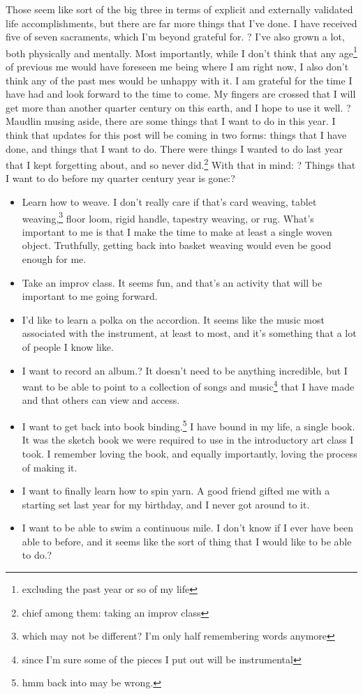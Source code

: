 \documentclass[12pt]{article}[titlepage]
\newcommand{\1}{\={a}}
\newcommand{\2}{\={e}}
\newcommand{\3}{\={\i}}
\newcommand{\4}{\=o}
\newcommand{\5}{\=u}
\newcommand{\6}{\={A}}
\renewcommand{\,}{\textsuperscript{,}}
\begin{document}
Those seem like sort of the big three in terms of explicit and externally validated life accomplishments, but there are far more things that I've done.
I have received five of seven sacraments, which I'm beyond grateful for.
?
I've also grown a lot, both physically and mentally.
Most importantly, while I don't think that any age\footnote{excluding the past year or so of my life} of previous me would have foreseen me being where I am right now, I also don't think any of the past mes would be unhappy with it.
I am grateful for the time I have had and look forward to the time to come.
My fingers are crossed that I will get more than another quarter century on this earth, and I hope to use it well.
?
Maudlin musing aside, there are some things that I want to do in this year.
I think that updates for this post will be coming in two forms: things that I have done, and things that I want to do.
There were things I wanted to do last year that I kept forgetting about, and so never did.\footnote{chief among them: taking an improv class}
With that in mind:
?
Things that I want to do before my quarter century year is gone:?
\begin{itemize}
\item Learn how to weave.
I don't really care if that's card weaving, tablet weaving,\footnote{which may not be different? I'm only half remembering words anymore} floor loom, rigid handle, tapestry weaving, or rug.
What's important to me is that I make the time to make at least a single woven object.
Truthfully, getting back into basket weaving would even be good enough for me.
\item Take an improv class.
It seems fun, and that's an activity that will be important to me going forward.
\item I'd like to learn a polka on the accordion.
It seems like the music most associated with the instrument, at least to most, and it's something that a lot of people I know like.
\item I want to record an album.?
It doesn't need to be anything incredible, but I want to be able to point to a collection of songs and music\footnote{since I'm sure some of the pieces I put out will be instrumental} that I have made and that others can view and access.
\item I want to get back into book binding.\footnote{hmm back into may be wrong.} I have bound in my life, a single book.
It was the sketch book we were required to use in the introductory art class I took.
I remember loving the book, and equally importantly, loving the process of making it.
\item I want to finally learn how to spin yarn.
A good friend gifted me with a starting set last year for my birthday, and I never got around to it.
\item I want to be able to swim a continuous mile.
I don't know if I ever have been able to before, and it seems like the sort of thing that I would like to be able to do.?
\end{itemize}
\end{document}
